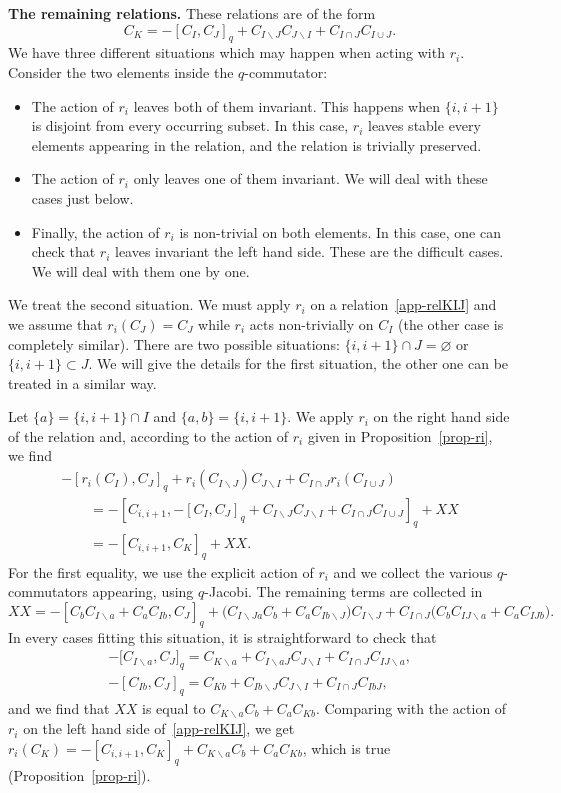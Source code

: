 \documentclass[10pt,a4paper]{amsart}
\numberwithin{equation}{section}
\theoremstyle{definition}
\begin{document}
{\bf The remaining relations.} These relations are of the form
\begin{equation}\label{app-relKIJ}
C_{K}=-[C_{I},C_{J}]_q+C_{I\backslash J}C_{J\backslash I}+C_{I\cap J}C_{I\cup J} .
\end{equation}
We have three different situations which may happen when acting with $r_i$. Consider the two elements inside the $q$-commutator:
\begin{itemize}\itemsep=0pt
\item The action of $r_i$ leaves both of them invariant. This happens when $\{i,i+1\}$ is disjoint from every occurring subset. In this case, $r_i$ leaves stable every elements appearing in the relation, and the relation is trivially preserved.
\item The action of $r_i$ only leaves one of them invariant. We will deal with these cases just below.
\item Finally, the action of $r_i$ is non-trivial on both elements. In this case, one can check that $r_i$ leaves invariant the left hand side. These are the difficult cases. We will deal with them one by one.
\end{itemize}
We treat the second situation. We must apply $r_i$ on a relation~\eqref{app-relKIJ}
and we assume that $r_i(C_J)=C_J$ while $r_i$ acts non-trivially on $C_I$ (the other case is completely similar). There are two possible situations: $\{i,i+1\}\cap J=\varnothing$ or $\{i,i+1\}\subset J$. We will give the details for the first situation, the other one can be treated in a similar way.

Let $\{a\}=\{i,i+1\}\cap I$ and $\{a,b\}=\{i,i+1\}$. We apply $r_i$ on the right hand side of the relation and, according to the action of $r_i$ given in Proposition~\ref{prop-ri}, we find
\begin{gather*}
 -[r_i(C_{I}),C_{J}]_q+r_i(C_{I\backslash J})C_{J\backslash I}+C_{I\cap J}r_i(C_{I\cup J})\\
 \qquad = -[C_{i,i+1},-[C_{I},C_{J}]_q+C_{I\backslash J}C_{J\backslash I}+C_{I\cap J}C_{I\cup J}]_q + XX \\
 \qquad = -[C_{i,i+1},C_K]_q + XX .
\end{gather*}
For the first equality, we use the explicit action of $r_i$ and we collect the various $q$-commutators appearing, using $q$-Jacobi. The remaining terms are collected in
\[
XX=-[C_bC_{I\backslash a}+C_aC_{Ib},C_J]_q+\big(C_{I\backslash Ja}C_b+C_aC_{Ib\backslash J}\big)C_{I\backslash J}+C_{I\cap J}\big(C_bC_{IJ\backslash a}+C_aC_{IJb}\big) .\]
In every cases fitting this situation, it is straightforward to check that
\begin{gather*}
-\big[C_{I\backslash a},C_J\big]_q=C_{K\backslash a}+C_{I\backslash aJ}C_{J\backslash I}+C_{I\cap J}C_{IJ\backslash a} ,\\
-[C_{Ib},C_J]_q=C_{Kb}+C_{Ib\backslash J}C_{J\backslash I}+C_{I\cap J}C_{IbJ} ,
\end{gather*}
and we find that $XX$ is equal to $C_{K\backslash a}C_b+C_aC_{Kb}$. Comparing with the action of $r_i$ on the left hand side of~\eqref{app-relKIJ}, we get
$r_i(C_K) = -[C_{i,i+1},C_K]_q +C_{K\backslash a}C_b+C_aC_{Kb}$, which is true (Proposition~\ref{prop-ri}).
\end{document}
